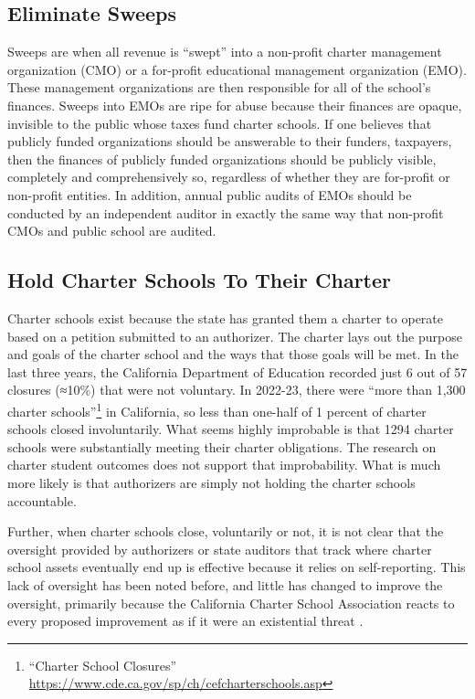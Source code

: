 \subsection{Eliminate Sweeps}%
\label{sec:eliminate-sweeps}\indent

Sweeps are when all revenue is ``swept'' into a non-profit charter management organization (CMO) or a for-profit educational management organization (EMO). These management organizations are then responsible for all of the school's finances. Sweeps into EMOs are ripe for abuse because their finances are opaque, invisible to the public whose taxes fund charter schools. If one believes that publicly funded organizations should be answerable to their funders, taxpayers, then the finances of publicly funded organizations should be publicly visible, completely and comprehensively so, regardless of whether they are for-profit or non-profit entities. In addition, annual public audits of EMOs should be conducted by an independent auditor in exactly the same way that non-profit CMOs and public school are audited.

\subsection{Hold Charter Schools To Their Charter}%
\label{sec:hold-charter-schools}\indent

Charter schools exist because the state has granted them a charter to operate based on a petition submitted to an authorizer. The charter lays out the purpose and goals of the charter school and the ways that those goals will be met. In the last three years, the California Department of Education  recorded just 6 out of 57 closures (≈10\%) that were not voluntary. In 2022-23, there were ``more than 1,300 charter schools''\footnote{``Charter School Closures'' \url{https://www.cde.ca.gov/sp/ch/cefcharterschools.asp}} in California, so less than one-half of 1 percent of charter schools closed involuntarily. What seems highly improbable is that 1294 charter schools were substantially meeting their charter obligations. The research on charter student outcomes does not support that improbability. What is much more likely is that authorizers are simply not holding the charter schools accountable.

Further, when charter schools close, voluntarily or not, it is not clear that the oversight provided by authorizers or state auditors that track where charter school assets eventually end up is effective because it relies on self-reporting. This lack of oversight has been noted before, and little has changed to improve the oversight, primarily because the California Charter School Association reacts to every proposed improvement as if it were an existential threat \parencite{Taketa2021a, ODonnell.etal2021}.

